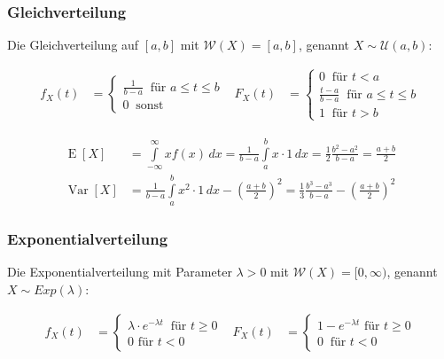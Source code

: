 \documentclass[25pt]{sciposter}
\newcommand{\W}{\mathcal{W}}
\newcommand{\U}{\mathcal{U}}
\newcommand{\Var}{\operatorname{Var}}
\newcommand{\E}{\operatorname{E}}
\begin{document}
\begin{multicols}{3}
		\subsubsection*{Gleichverteilung}
		Die Gleichverteilung auf $[a,b]$ mit $\W(X)=[a,b]$, genannt $X\sim\U(a,b)$:
		
		\begin{align*}
			f_X(t) &= \begin{cases}
				\frac{1}{b-a} \ \text{ für } a \leq t \leq b\\
				0 \ \text{ sonst}
			\end{cases}
			& 
			F_X(t) &= \begin{cases}
				0 \ \text{ für } t<a \\
				\frac{t-a}{b-a} \ \text{ für } a \leq t \leq b\\
				1 \ \text{ für } t > b
			\end{cases}
		\end{align*}
		
		
		\begin{align*}
			\E[X] &= {\displaystyle\int \limits _{-\infty }^{\infty }xf(x)\,dx={\frac {1}{b-a}}\int \limits _{a}^{b}x\cdot 1\,dx={\frac {1}{2}}{\frac {b^{2}-a^{2}}{b-a}}={\frac {a+b}{2}}} \\ \Var[X] &={\frac {1}{b-a}}\int \limits _{a}^{b}{x^{2}\cdot 1\,dx}-\left({\frac {a+b}{2}}\right)^{2}={\frac {1}{3}}{\frac {b^{3}-a^{3}}{b-a}}-\left({\frac {a+b}{2}}\right)^{2}
		\end{align*}
		
		
		
		
		\subsubsection*{Exponentialverteilung}
		Die Exponentialverteilung mit Parameter $\lambda > 0$ mit $\W(X)=[0,\infty)$, genannt $X\sim Exp(\lambda)$:
		
		\begin{align*}
			f_X(t) &= \begin{cases}
				\lambda \cdot e^{-\lambda t} \ \text{ für } t \geq 0\\
				0 \text{ für } t < 0
			\end{cases}
			& 
			F_X(t) &= \begin{cases}
				1-e^{-\lambda t} \text{ für } t\geq 0\\
				0 \ \text{ für } t < 0
			\end{cases}
		\end{align*}
		

\end{multicols}
\end{document}
